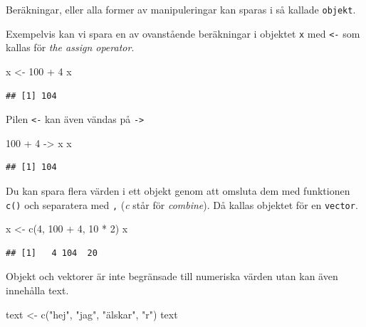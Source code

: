 \documentclass[
]{book}
\newenvironment{Shaded}{\begin{snugshade}}{\end{snugshade}}
\newcommand{\DecValTok}[1]{\textcolor[rgb]{0.00,0.00,0.81}{#1}}
\newcommand{\FunctionTok}[1]{\textcolor[rgb]{0.00,0.00,0.00}{#1}}
\newcommand{\NormalTok}[1]{#1}
\newcommand{\OtherTok}[1]{\textcolor[rgb]{0.56,0.35,0.01}{#1}}
\newcommand{\SpecialCharTok}[1]{\textcolor[rgb]{0.00,0.00,0.00}{#1}}
\newcommand{\StringTok}[1]{\textcolor[rgb]{0.31,0.60,0.02}{#1}}
\begin{document}
Beräkningar, eller alla former av manipuleringar kan sparas i så kallade \texttt{objekt}.

Exempelvis kan vi spara en av ovanstående beräkningar i objektet \texttt{x} med \texttt{\textless{}-} som kallas för \emph{the assign operator}.

\begin{Shaded}
\begin{Highlighting}[]
\NormalTok{x }\OtherTok{\textless{}{-}} \DecValTok{100} \SpecialCharTok{+} \DecValTok{4}
\NormalTok{x}
\end{Highlighting}
\end{Shaded}

\begin{verbatim}
## [1] 104
\end{verbatim}

Pilen \texttt{\textless{}-} kan även vändas på \texttt{-\textgreater{}}

\begin{Shaded}
\begin{Highlighting}[]
\DecValTok{100} \SpecialCharTok{+} \DecValTok{4} \OtherTok{{-}\textgreater{}}\NormalTok{ x}
\NormalTok{x}
\end{Highlighting}
\end{Shaded}

\begin{verbatim}
## [1] 104
\end{verbatim}

Du kan spara flera värden i ett objekt genom att omsluta dem med funktionen \texttt{c()} och separatera med \texttt{,} (\emph{c} står för \emph{combine}). Då kallas objektet för en \texttt{vector}.

\begin{Shaded}
\begin{Highlighting}[]
\NormalTok{x }\OtherTok{\textless{}{-}} \FunctionTok{c}\NormalTok{(}\DecValTok{4}\NormalTok{, }\DecValTok{100} \SpecialCharTok{+} \DecValTok{4}\NormalTok{, }\DecValTok{10} \SpecialCharTok{*} \DecValTok{2}\NormalTok{)}
\NormalTok{x}
\end{Highlighting}
\end{Shaded}

\begin{verbatim}
## [1]   4 104  20
\end{verbatim}

Objekt och vektorer är inte begränsade till numeriska värden utan kan även innehålla text.

\begin{Shaded}
\begin{Highlighting}[]
\NormalTok{text }\OtherTok{\textless{}{-}} \FunctionTok{c}\NormalTok{(}\StringTok{"hej"}\NormalTok{, }\StringTok{"jag"}\NormalTok{, }\StringTok{"älskar"}\NormalTok{, }\StringTok{"r"}\NormalTok{)}
\NormalTok{text}
\end{Highlighting}
\end{Shaded}
\end{document}
